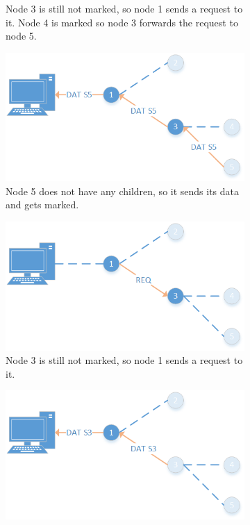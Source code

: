 \begin{figure}[htbp]
\begin{subfigure}[t]{0.4\textwidth}
        \caption{Node 3 is still not marked, so node 1 sends a request to it. Node 4 is marked so node 3 forwards the request to node 5.}
        \label{fig:coll5}
    \end{subfigure}
    \quad
    \quad
    \begin{subfigure}[t]{0.4\textwidth}
		\centering         
        \includegraphics[scale=0.6]{content/images/Collection/Part6}
        \caption{Node 5 does not have any children, so it sends its data and gets marked.}
        \label{fig:coll6}
    \end{subfigure}
    \quad
    \quad
    \begin{subfigure}[t]{0.4\textwidth}
		\centering         
        \includegraphics[scale=0.6]{content/images/Collection/Part7}
        \caption{Node 3 is still not marked, so node 1 sends a request to it.}
        \label{fig:coll7}
    \end{subfigure}
    \quad
    \quad
    \begin{subfigure}[t]{0.4\textwidth}
		\centering         
        \includegraphics[scale=0.6]{content/images/Collection/Part8}

\end{subfigure}
\end{figure}
